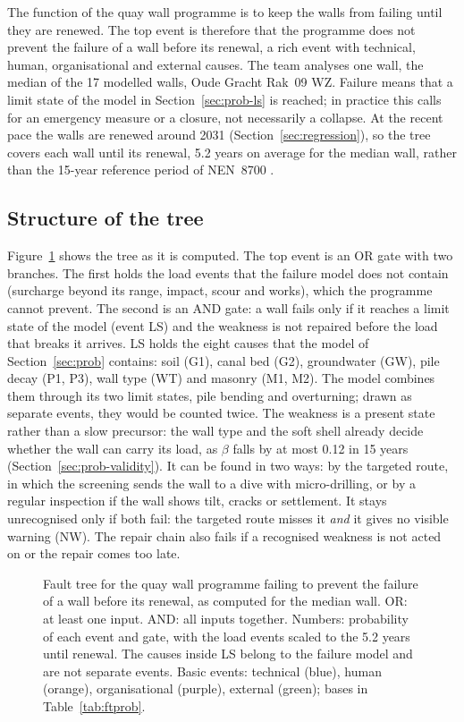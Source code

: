 The function of the quay wall programme is to keep the walls from failing until
they are renewed. The top event is therefore that the programme does not prevent
the failure of a wall before its renewal, a rich event with technical, human,
organisational and external causes. The team analyses one wall, the median of
the 17 modelled walls, Oude Gracht Rak~09 WZ. Failure means that a limit state of
the model in Section~\ref{sec:prob-ls} is reached; in practice this calls for an
emergency measure or a closure, not necessarily a collapse. At the recent pace
the walls are renewed around 2031 (Section~\ref{sec:regression}), so the tree
covers each wall until its renewal, 5.2 years on average for the median wall,
rather than the 15-year reference period of NEN~8700 \parencite{nen8700}.

\subsection{Structure of the tree}\label{sec:ft-structure}

Figure~\ref{fig:faulttree} shows the tree as it is computed. The top event is
an OR gate with two branches. The first holds the load events that the failure model does not contain (surcharge beyond its range, impact, scour and works), which the programme cannot prevent. The second is an AND gate: a wall fails
only if it reaches a limit state of the model (event LS) and the weakness is
not repaired before the load that breaks it arrives. LS holds the eight causes that the model of Section~\ref{sec:prob} contains: soil (G1), canal bed (G2), groundwater (GW), pile decay (P1, P3), wall type (WT) and masonry (M1, M2). The model combines them through its two limit states, pile bending and overturning; drawn as separate events, they would be counted twice. The weakness is a
present state rather than a slow precursor: the wall type and the soft shell
already decide whether the wall can carry its load, as $\beta$ falls by at most
0.12 in 15 years (Section~\ref{sec:prob-validity}). It can be found in two
ways: by the targeted route, in which the screening sends the wall to a dive with
micro-drilling, or by a regular inspection if the wall shows tilt, cracks or
settlement. It stays unrecognised only if both fail: the targeted route misses
it \emph{and} it gives no visible warning (NW). The repair chain also fails if a
recognised weakness is not acted on or the repair comes too late.

\begin{figure}[ht]
  \centering
  
  \caption{Fault tree for the quay wall programme failing to prevent the failure of a wall before its renewal, as computed for the median wall. OR: at least one input. AND: all inputs together. Numbers: probability of each event and gate, with the load events scaled to the 5.2 years until renewal. The causes inside LS belong to the failure model and are not separate events. Basic events: technical (blue), human (orange), organisational (purple), external (green); bases in Table~\ref{tab:ftprob}.}
  \label{fig:faulttree}
\end{figure}

